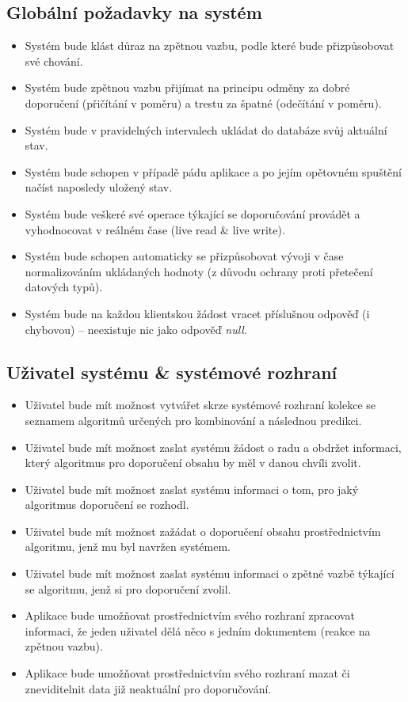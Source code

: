 \documentclass[thesis=M,czech]{FITthesis}[2014/05/07]
\begin{document}
\subsection{Globální požadavky na systém}

\begin{itemize}
	\item Systém bude klást důraz na zpětnou vazbu, podle které bude přizpůsobovat své chování.
	\item Systém bude zpětnou vazbu přijímat na principu odměny za dobré doporučení (přičítání v poměru) a trestu za špatné (odečítání v poměru).
	\item Systém bude v pravidelných intervalech ukládat do databáze svůj aktuální stav.
	\item Systém bude schopen v případě pádu aplikace a po jejím opětovném spuštění načíst naposledy uložený stav.
	\item Systém bude veškeré své operace týkající se doporučování provádět a vyhodnocovat v reálném čase (live read \& live write).
	\item Systém bude schopen automaticky se přizpůsobovat vývoji v čase normalizováním ukládaných hodnoty (z důvodu ochrany proti přetečení datových typů).	
	\item Systém bude na každou klientskou žádost vracet příslušnou odpověď (i chybovou) – neexistuje nic jako odpověď \emph{null}.	
\end{itemize}

\subsection{Uživatel systému \& systémové rozhraní}

\begin{itemize}
	\item Uživatel bude mít možnost vytvářet skrze systémové rozhraní kolekce se seznamem algoritmů určených pro kombinování a následnou predikci.
	\item Uživatel bude mít možnost zaslat systému žádost o radu a obdržet informaci, který algoritmus pro doporučení obsahu by měl v danou chvíli zvolit.
	\item Uživatel bude mít možnost zaslat systému informaci o tom, pro jaký algoritmus doporučení se rozhodl.
	\item Uživatel bude mít možnost zažádat o doporučení obsahu prostřednictvím algoritmu, jenž mu byl navržen systémem.
	\item Uživatel bude mít možnost zaslat systému informaci o zpětné vazbě týkající se algoritmu, jenž si pro doporučení zvolil.
	\item Aplikace bude umožňovat prostřednictvím svého rozhraní zpracovat informaci, že jeden uživatel dělá něco s jedním dokumentem (reakce na zpětnou vazbu).
	\item Aplikace bude umožňovat prostřednictvím svého rozhraní mazat či zneviditelnit data již neaktuální pro doporučování.
\end{itemize}
\end{document}
